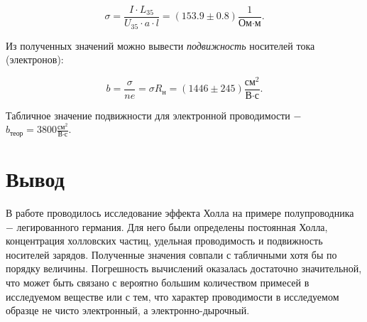 \documentclass[a4paper,12pt]{article} %
\begin{document}
$$
\sigma = \frac{I \cdot L_{35}}{U_{35} \cdot a \cdot l} = (153.9 \pm 0.8) \frac{1}{\text{Ом} \cdot \text{м}}.
$$

\hfill \break Из полученных значений можно вывести \textit{подвижность} носителей тока (электронов):

$$
b = \frac{\sigma}{ne} = \sigma R_\text{н} = (1446 \pm 245) \frac{\text{см}^2}{\text{В} \cdot \text{с}}.
$$

\hfill \break Табличное значение подвижности для электронной проводимости $-$ $b_\text{теор} = 3800 \frac{\text{см}^2}{\text{В} \cdot \text{с}}.$

\section{Вывод}
\hfill \break В работе проводилось исследование эффекта Холла на примере полупроводника $-$ легированного германия. Для него были определены постоянная Холла, концентрация холловских частиц, удельная проводимость и подвижность носителей зарядов. Полученные значения совпали с табличными хотя бы по порядку величины. Погрешность вычислений оказалась достаточно значительной, что может быть связано с вероятно большим количеством примесей в исследуемом веществе или с тем, что характер проводимости в исследуемом образце не чисто электронный, а электронно-дырочный.
\end{document}
